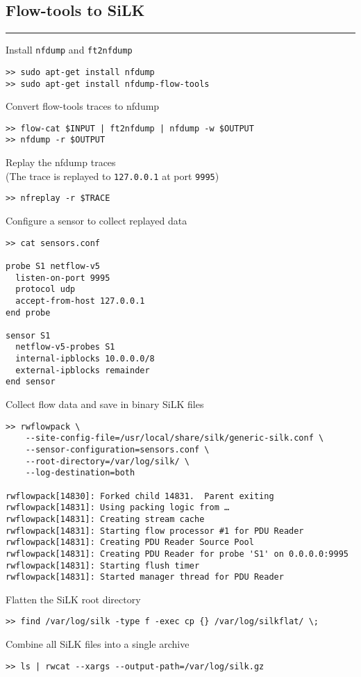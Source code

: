 \subsection{Flow-tools to SiLK}

\begin{center}\rule{3in}{0.4pt}\end{center}

Install \lstinline!nfdump! and \lstinline!ft2nfdump!

\begin{lstlisting}
>> sudo apt-get install nfdump
>> sudo apt-get install nfdump-flow-tools
\end{lstlisting}

Convert flow-tools traces to nfdump

\begin{lstlisting}
>> flow-cat $INPUT | ft2nfdump | nfdump -w $OUTPUT
>> nfdump -r $OUTPUT
\end{lstlisting}

Replay the nfdump traces\\(The trace is replayed to
\lstinline!127.0.0.1! at port \lstinline!9995!)

\begin{lstlisting}
>> nfreplay -r $TRACE
\end{lstlisting}

Configure a sensor to collect replayed data

\begin{lstlisting}
>> cat sensors.conf

probe S1 netflow-v5
  listen-on-port 9995
  protocol udp
  accept-from-host 127.0.0.1
end probe

sensor S1
  netflow-v5-probes S1
  internal-ipblocks 10.0.0.0/8
  external-ipblocks remainder
end sensor
\end{lstlisting}

Collect flow data and save in binary SiLK files

\begin{lstlisting}
>> rwflowpack \
    --site-config-file=/usr/local/share/silk/generic-silk.conf \
    --sensor-configuration=sensors.conf \
    --root-directory=/var/log/silk/ \
    --log-destination=both

rwflowpack[14830]: Forked child 14831.  Parent exiting
rwflowpack[14831]: Using packing logic from …                       rwflowpack[14831]: Creating stream cache
rwflowpack[14831]: Starting flow processor #1 for PDU Reader
rwflowpack[14831]: Creating PDU Reader Source Pool
rwflowpack[14831]: Creating PDU Reader for probe 'S1' on 0.0.0.0:9995
rwflowpack[14831]: Starting flush timer
rwflowpack[14831]: Started manager thread for PDU Reader
\end{lstlisting}

Flatten the SiLK root directory

\begin{lstlisting}
>> find /var/log/silk -type f -exec cp {} /var/log/silkflat/ \;
\end{lstlisting}

Combine all SiLK files into a single archive

\begin{lstlisting}
>> ls | rwcat --xargs --output-path=/var/log/silk.gz
\end{lstlisting}

